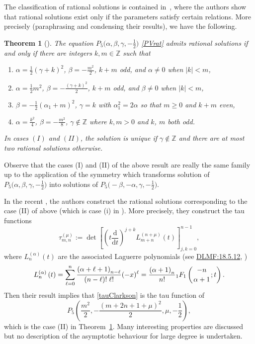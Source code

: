\documentclass[pdftex]{sigma}
\numberwithin{equation}{section}
\newtheorem{Theorem}{Theorem}[section]
\theoremstyle{definition}
\def\le{\left}
\def\ri{\right}
\def \d{{\mathrm d}}
\def\be{\begin{equation}}
\def\ee{\end{equation}}
\def\Z{{\mathbb Z}}
\begin{document}
The classification of rational solutions is contained in~\cite{Kitaev94}, where the authors show that rational solutions exist only if the parameters satisfy certain relations. More precisely (paraphrasing and condensing their results), we have the following.

\begin{Theorem}[{\cite[Theorems~1.1 and~1.2]{Kitaev94}}]
\label{thmKitaev}
The equation $P_5\bigl(\alpha,\beta,\gamma,-\frac 1 2\bigr)$ \eqref{PVrat} admits rational solutions if and only if there are integers $k,m\in \Z$ such that
\begin{enumerate}[leftmargin=31pt]\itemsep=0pt
\item[$(I)$] $\alpha = \frac 1 2 (\gamma +k)^2$, $\beta = - \frac {m^2}2$, $k+m$ odd, and $\alpha\neq 0 $ when $|k|<m$,
\item[$(II)$] $\alpha = \frac 1 2 m^2$, $\beta = - \frac {(\gamma +k)^2}2$, $k+m$ odd, and $\beta\neq 0 $ when $|k|<m$,
\item [$(III)$] $\beta = -\frac 1 2(\alpha_1+m)^2$, $\gamma=k$ with $\alpha_1^2=2\alpha$ so that $m\geq 0 $ and $k+m$ even,
\item [$(IV)$] $\alpha =\frac {k^2}4$, $\beta = -\frac {m^2}8$, $\gamma \not\in \mathbb Z$ where $k,m>0$ and $k$, $m$ both odd.
\end{enumerate}
In cases $(I)$ and $(II)$, the solution is unique if $\gamma \not\in\Z$ and there are at most two rational solutions otherwise.
\end{Theorem}
Observe that the cases (I) and (II) of the above result are really the same family up to the application of the symmetry  which transforms solution of $P_5\bigl(\alpha, \beta, \gamma, -\frac 1 2\bigr)$ into solutions of $P_5\bigl(-\beta, -\alpha, \gamma, -\frac 1 2\bigr)$.

In the recent \cite{ClarksonDunning}, the authors construct the rational solutions corresponding to the case (II) of \cite{Kitaev94} above (which is case (i) in \cite[Theorem~4.1]{ClarksonDunning}).
More precisely, they construct the tau functions
\be
\label{tauClarkson}
\tau^{(\mu)}_{m,n} := \det \le[\le(t \frac \d{\d t}\ri)^{j+k} L^{(n+\mu)}_{m+n} (t)\ri]_{j,k=0}^{n-1},
\ee
where $L^{( \alpha)}_n(t)$ are the associated Laguerre polynomials (see \href{https://dlmf.nist.gov/18.5.E12}{DLMF:18.5.12}, \cite{DLMF})
\[
L^{(\alpha)}_{n}\left(t\right)=\sum_{\ell=0}^{n}\frac{{\left(\alpha+\ell+1%
\right)_{n-\ell}}}{(n-\ell)!\;\ell!}(-x)^{\ell}=\frac{{\left(\alpha+1\right)_{%
n}}}{n!}{{}_{1}F_{1}}\left({-n\atop\alpha+1};t\right).
\]
Then their result implies that \eqref{tauClarkson} is the tau function of
\[
P_5\le( \frac {m^2}2,- \frac{(m+2n+1+\mu)^2} 2, \mu, -\frac 1 2\ri),
\]
 which is the case (II) in Theorem~\ref{thmKitaev}.
Many interesting properties are discussed but no description of the asymptotic behaviour for large degree is undertaken.
\end{document}
